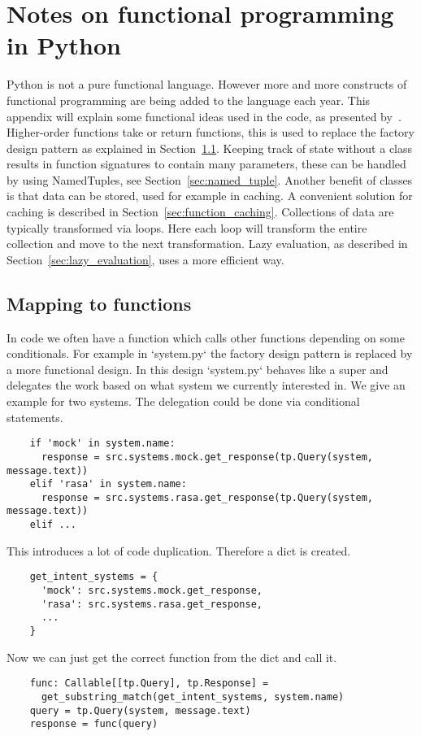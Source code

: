 \chapter{Notes on functional programming in Python}
\label{ch:fp}

Python is not a pure functional language.
However more and more constructs of functional programming are being added to the language each year.
This appendix will explain some functional ideas used in the code, as presented by~\citet{lott2015}.
Higher-order functions take or return functions, this is used to replace the factory design pattern as explained in Section~\ref{sec:mapping_to_functions}.
Keeping track of state without a class results in function signatures to contain many parameters, these can be handled by using NamedTuples, see Section~\ref{sec:named_tuple}.
Another benefit of classes is that data can be stored, used for example in caching.
A convenient solution for caching is described in Section~\ref{sec:function_caching}.
Collections of data are typically transformed via loops.
Here each loop will transform the entire collection and move to the next transformation.
Lazy evaluation, as described in Section~\ref{sec:lazy_evaluation}, uses a more efficient way.

\section{Mapping to functions}
\label{sec:mapping_to_functions}
In code we often have a function which calls other functions depending on some conditionals.
For example in `system.py` the factory design pattern is replaced by a more functional design.
In this design `system.py` behaves like a super and delegates the work based on what system
we currently interested in.
We give an example for two systems.
The delegation could be done via conditional statements.

\begin{verbatim}
    if 'mock' in system.name:
      response = src.systems.mock.get_response(tp.Query(system, message.text))
    elif 'rasa' in system.name:
      response = src.systems.rasa.get_response(tp.Query(system, message.text))
    elif ...
\end{verbatim}

This introduces a lot of code duplication.
Therefore a dict is created.
\begin{verbatim}
    get_intent_systems = {
      'mock': src.systems.mock.get_response,
      'rasa': src.systems.rasa.get_response,
      ...
    }
\end{verbatim}
Now we can just get the correct function from the dict and call it.
\begin{verbatim}
    func: Callable[[tp.Query], tp.Response] =
      get_substring_match(get_intent_systems, system.name)
    query = tp.Query(system, message.text)
    response = func(query)
\end{verbatim}

